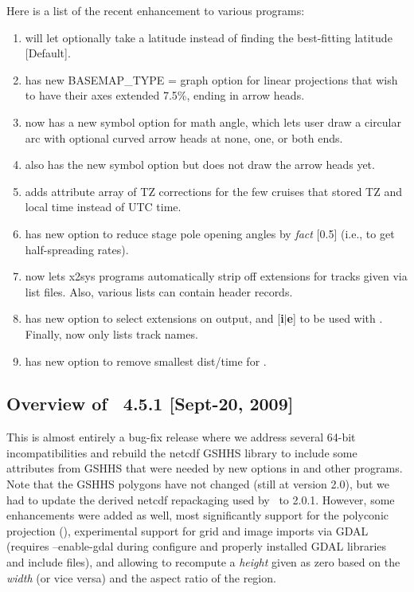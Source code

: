 Here is a list of the recent enhancement to various programs:

\begin{enumerate}
	\item {} will let  optionally take a latitude instead of finding
		the best-fitting latitude [Default].
	\item {} has new BASEMAP\_TYPE = graph option for linear projections that wish to
		have their axes extended 7.5\%, ending in arrow heads.
	\item {} now has a new symbol  option for math angle, which lets
		user draw a circular arc with optional curved arrow
		heads at none, one, or both ends.
	\item {} also has the new symbol  option but does not draw the arrow heads yet.
	\item {} adds attribute array of TZ corrections for the few cruises
		that stored TZ and local time instead of UTC time.
	\item {} has new option  to reduce stage pole opening
		angles by {\it fact} [0.5] (i.e., to get half-spreading rates).
	\item {} now lets x2sys programs automatically strip off extensions for tracks given via list files.
		Also, various lists can contain header records.
	\item {} has new option  to select extensions on output, and [{\bf i$|$e}] to be used with .
	Finally,  now only lists track names.
	\item {} has new option  to remove smallest dist/time for .
\end{enumerate}

\subsection{Overview of \gmt\ 4.5.1 [Sept-20, 2009]}

This is almost entirely a bug-fix release where we address several 64-bit incompatibilities and
rebuild the netcdf GSHHS library to include some attributes from GSHHS that were needed
by new options in  and other programs.  Note that the GSHHS polygons have not changed (still
at version 2.0), but we had to update the derived netcdf repackaging used by \GMT\ to 2.0.1.
However, some enhancements were added as well, most significantly support for the polyconic
projection (), experimental support for grid and image imports via GDAL
(requires --enable-gdal during configure and properly installed GDAL libraries and include files),
and allowing  to recompute a {\it height} given as zero based on the
{\it width} (or vice versa) and the aspect ratio of the region.

